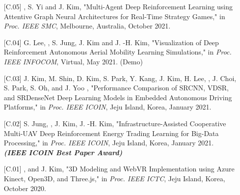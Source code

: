 \documentclass[10pt,letterpaper]{article}
\begin{document}
{\begin{itemize}
\begin{itemize}
      \item[\textsf{[C.05]}] , S. Yi and J. Kim, "Multi-Agent Deep Reinforcement Learning using Attentive Graph Neural Architectures for Real-Time Strategy Games," in \textit{Proc. IEEE SMC}, Melbourne, Australia, October 2021. 
      
      \item[\textsf{[C.04]}] G. Lee, , S. Jung, J. Kim and J. -H. Kim, "Visualization of Deep Reinforcement Autonomous Aerial Mobility Learning Simulations," in \textit{Proc. IEEE INFOCOM}, Virtual, May 2021. (Demo)
      
      \item[\textsf{[C.03]}] J. Kim, M. Shin, D. Kim, S. Park, Y. Kang, J. Kim, H. Lee, , J. Choi, S. Park, S. Oh, and J. Yoo , "Performance Comparison of SRCNN, VDSR, and SRDenseNet Deep Learning Models in Embedded Autonomous Driving Platforms," in \textit{Proc. IEEE ICOIN}, Jeju Island, Korea, January 2021.
      
      \item[\textsf{[C.02]}] S. Jung, , J. Kim, J. -H. Kim, "Infrastructure-Assisted Cooperative Multi-UAV Deep Reinforcement Energy Trading Learning for Big-Data Processing," in \textit{Proc. IEEE ICOIN}, Jeju Island, Korea, January 2021.
      \\ {\color{blue}\textit{\textbf{(IEEE ICOIN Best Paper Award)}}}
      
      \item[\textsf{[C.01]}] , and J. Kim, "3D Modeling and WebVR Implementation using Azure Kinect, Open3D, and Three.js," in \textit{Proc. IEEE ICTC}, Jeju Island, Korea, October 2020. 
      
         \end{itemize}
         \end{itemize}
}
\end{document}
